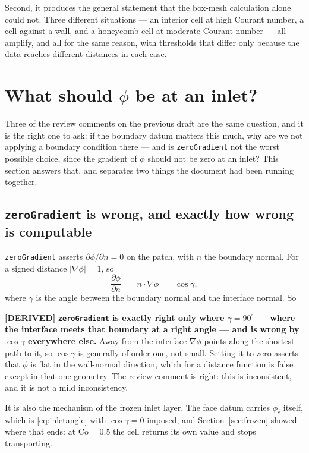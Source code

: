 \documentclass[11pt,a4paper]{article}
\newcommand{\derived}{\textcolor{blue!50!black}{\textbf{[DERIVED]}}}
\begin{document}
Second, it produces the general statement that the box-mesh calculation alone could not. Three
different situations --- an interior cell at high Courant number, a cell against a wall, and a
honeycomb cell at moderate Courant number --- all amplify, and all for the same reason, with
thresholds that differ only because the data reaches different distances in each case.


\section{What should \texorpdfstring{$\phi$}{phi} be at an inlet?}
\label{sec:inlet}

Three of the review comments on the previous draft are the same question, and it is the right
one to ask: if the boundary datum matters this much, why are we not applying a boundary
condition there --- and is \texttt{zeroGradient} not the worst possible choice, since the
gradient of \(\phi\) should not be zero at an inlet? This section answers that, and separates
two things the document had been running together.

\subsection{\texttt{zeroGradient} is wrong, and exactly how wrong is computable}

\texttt{zeroGradient} asserts \(\partial\phi/\partial n = 0\) on the patch, with \(n\) the
boundary normal. For a signed distance \(|\nabla\phi| = 1\), so
\begin{equation}
  \frac{\partial \phi}{\partial n} \;=\; n\cdot\nabla\phi \;=\; \cos\gamma ,
  \label{eq:inletangle}
\end{equation}
where \(\gamma\) is the angle between the boundary normal and the interface normal. So

\derived{} \textbf{\texttt{zeroGradient} is exactly right only where \(\gamma = 90^\circ\) ---
where the interface meets that boundary at a right angle --- and is wrong by \(\cos\gamma\)
everywhere else.} Away from the interface \(\nabla\phi\) points along the shortest path to it,
so \(\cos\gamma\) is generally of order one, not small. Setting it to zero asserts that
\(\phi\) is flat in the wall-normal direction, which for a distance function is false except in
that one geometry. The review comment is right: this is inconsistent, and it is not a mild
inconsistency.

It is also the mechanism of the frozen inlet layer. The face datum carries \(\phi_c\) itself,
which is \eqref{eq:inletangle} with \(\cos\gamma = 0\) imposed, and
Section~\ref{sec:frozen} showed where that ends: at \(\mathrm{Co} = 0.5\) the cell returns its
own value and stops transporting.
\end{document}

